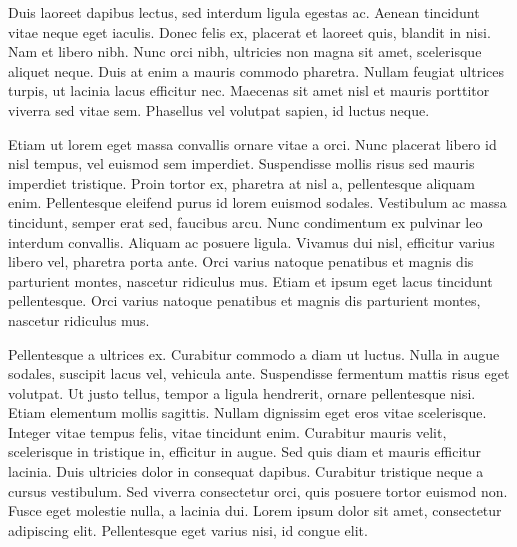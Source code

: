 Duis laoreet dapibus lectus, sed interdum ligula egestas ac. Aenean tincidunt vitae neque eget iaculis. Donec felis ex, placerat et laoreet quis, blandit in nisi. Nam et libero nibh. Nunc orci nibh, ultricies non magna sit amet, scelerisque aliquet neque. Duis at enim a mauris commodo pharetra. Nullam feugiat ultrices turpis, ut lacinia lacus efficitur nec. Maecenas sit amet nisl et mauris porttitor viverra sed vitae sem. Phasellus vel volutpat sapien, id luctus neque.

Etiam ut lorem eget massa convallis ornare vitae a orci. Nunc placerat libero id nisl tempus, vel euismod sem imperdiet. Suspendisse mollis risus sed mauris imperdiet tristique. Proin tortor ex, pharetra at nisl a, pellentesque aliquam enim. Pellentesque eleifend purus id lorem euismod sodales. Vestibulum ac massa tincidunt, semper erat sed, faucibus arcu. Nunc condimentum ex pulvinar leo interdum convallis. Aliquam ac posuere ligula. Vivamus dui nisl, efficitur varius libero vel, pharetra porta ante. Orci varius natoque penatibus et magnis dis parturient montes, nascetur ridiculus mus. Etiam et ipsum eget lacus tincidunt pellentesque. Orci varius natoque penatibus et magnis dis parturient montes, nascetur ridiculus mus.

Pellentesque a ultrices ex. Curabitur commodo a diam ut luctus. Nulla in augue sodales, suscipit lacus vel, vehicula ante. Suspendisse fermentum mattis risus eget volutpat. Ut justo tellus, tempor a ligula hendrerit, ornare pellentesque nisi. Etiam elementum mollis sagittis. Nullam dignissim eget eros vitae scelerisque. Integer vitae tempus felis, vitae tincidunt enim. Curabitur mauris velit, scelerisque in tristique in, efficitur in augue. Sed quis diam et mauris efficitur lacinia. Duis ultricies dolor in consequat dapibus. Curabitur tristique neque a cursus vestibulum. Sed viverra consectetur orci, quis posuere tortor euismod non. Fusce eget molestie nulla, a lacinia dui. Lorem ipsum dolor sit amet, consectetur adipiscing elit. Pellentesque eget varius nisi, id congue elit.